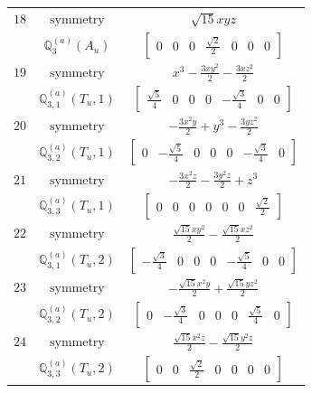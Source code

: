 \documentclass[fleqn,8pt,landscape]{jsarticle}
\begin{document}
\begin{longtable}{ccc}
$ 18 $ & $ \text{symmetry} $ & $ \sqrt{15} x y z $ \\
$  $ & $ \mathbb{Q}_{3}^{(a)}(A_{u}) $ & $ \begin{bmatrix} 0 & 0 & 0 & \frac{\sqrt{2}}{2} & 0 & 0 & 0 \end{bmatrix} $ \\ \hline
$ 19 $ & $ \text{symmetry} $ & $ x^{3} - \frac{3 x y^{2}}{2} - \frac{3 x z^{2}}{2} $ \\
$  $ & $ \mathbb{Q}_{3,1}^{(a)}(T_{u},1) $ & $ \begin{bmatrix} \frac{\sqrt{5}}{4} & 0 & 0 & 0 & - \frac{\sqrt{3}}{4} & 0 & 0 \end{bmatrix} $ \\ \hline
$ 20 $ & $ \text{symmetry} $ & $ - \frac{3 x^{2} y}{2} + y^{3} - \frac{3 y z^{2}}{2} $ \\
$  $ & $ \mathbb{Q}_{3,2}^{(a)}(T_{u},1) $ & $ \begin{bmatrix} 0 & - \frac{\sqrt{5}}{4} & 0 & 0 & 0 & - \frac{\sqrt{3}}{4} & 0 \end{bmatrix} $ \\ \hline
$ 21 $ & $ \text{symmetry} $ & $ - \frac{3 x^{2} z}{2} - \frac{3 y^{2} z}{2} + z^{3} $ \\
$  $ & $ \mathbb{Q}_{3,3}^{(a)}(T_{u},1) $ & $ \begin{bmatrix} 0 & 0 & 0 & 0 & 0 & 0 & \frac{\sqrt{2}}{2} \end{bmatrix} $ \\ \hline
$ 22 $ & $ \text{symmetry} $ & $ \frac{\sqrt{15} x y^{2}}{2} - \frac{\sqrt{15} x z^{2}}{2} $ \\
$  $ & $ \mathbb{Q}_{3,1}^{(a)}(T_{u},2) $ & $ \begin{bmatrix} - \frac{\sqrt{3}}{4} & 0 & 0 & 0 & - \frac{\sqrt{5}}{4} & 0 & 0 \end{bmatrix} $ \\ \hline
$ 23 $ & $ \text{symmetry} $ & $ - \frac{\sqrt{15} x^{2} y}{2} + \frac{\sqrt{15} y z^{2}}{2} $ \\
$  $ & $ \mathbb{Q}_{3,2}^{(a)}(T_{u},2) $ & $ \begin{bmatrix} 0 & - \frac{\sqrt{3}}{4} & 0 & 0 & 0 & \frac{\sqrt{5}}{4} & 0 \end{bmatrix} $ \\ \hline
$ 24 $ & $ \text{symmetry} $ & $ \frac{\sqrt{15} x^{2} z}{2} - \frac{\sqrt{15} y^{2} z}{2} $ \\
$  $ & $ \mathbb{Q}_{3,3}^{(a)}(T_{u},2) $ & $ \begin{bmatrix} 0 & 0 & \frac{\sqrt{2}}{2} & 0 & 0 & 0 & 0 \end{bmatrix} $ \\ \hline

\end{longtable}
\end{document}
